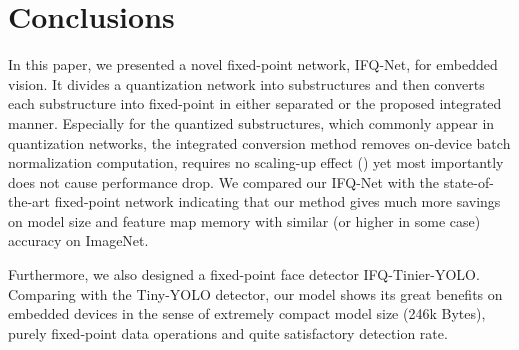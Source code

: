 \documentclass[10pt,twocolumn,letterpaper]{article}
\begin{document}
\section{Conclusions}
In this paper, we presented a novel fixed-point network, IFQ-Net, for embedded vision. It divides a quantization network into substructures and then converts each substructure into fixed-point in either separated or the proposed integrated manner. Especially for the quantized substructures,  which commonly appear in quantization networks, the integrated conversion method removes on-device batch normalization computation, requires no scaling-up effect () yet most importantly does not cause performance drop. We compared our IFQ-Net with the state-of-the-art fixed-point network indicating that our method gives much more savings on model size and feature map memory with similar (or higher in some case) accuracy on ImageNet.

Furthermore, we also designed a fixed-point face detector IFQ-Tinier-YOLO. Comparing with the Tiny-YOLO detector, our model shows its great benefits on embedded devices in the sense of extremely compact model size (246k Bytes), purely fixed-point data operations and quite satisfactory detection rate.

{\small


}
\end{document}
